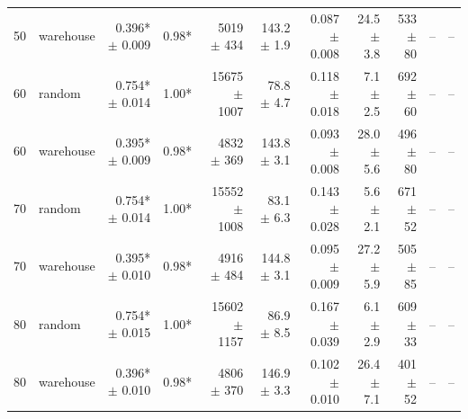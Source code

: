 \begin{tabular}{llrrrrrrrrr}
50 & warehouse & \num{0.396}* $\pm$ \num{0.009} & \num{0.98}* & \num{5019} $\pm$ \num{434} & \num{143.2} $\pm$ \num{1.9} & \num{0.087} $\pm$ \num{0.008} & \num{24.5} $\pm$ \num{3.8} & \num{533} $\pm$ \num{80} & -- & -- \\
60 & random & \num{0.754}* $\pm$ \num{0.014} & \num{1.00}* & \num{15675} $\pm$ \num{1007} & \num{78.8} $\pm$ \num{4.7} & \num{0.118} $\pm$ \num{0.018} & \num{7.1} $\pm$ \num{2.5} & \num{692} $\pm$ \num{60} & -- & -- \\
60 & warehouse & \num{0.395}* $\pm$ \num{0.009} & \num{0.98}* & \num{4832} $\pm$ \num{369} & \num{143.8} $\pm$ \num{3.1} & \num{0.093} $\pm$ \num{0.008} & \num{28.0} $\pm$ \num{5.6} & \num{496} $\pm$ \num{80} & -- & -- \\
70 & random & \num{0.754}* $\pm$ \num{0.014} & \num{1.00}* & \num{15552} $\pm$ \num{1008} & \num{83.1} $\pm$ \num{6.3} & \num{0.143} $\pm$ \num{0.028} & \num{5.6} $\pm$ \num{2.1} & \num{671} $\pm$ \num{52} & -- & -- \\
70 & warehouse & \num{0.395}* $\pm$ \num{0.010} & \num{0.98}* & \num{4916} $\pm$ \num{484} & \num{144.8} $\pm$ \num{3.1} & \num{0.095} $\pm$ \num{0.009} & \num{27.2} $\pm$ \num{5.9} & \num{505} $\pm$ \num{85} & -- & -- \\
80 & random & \num{0.754}* $\pm$ \num{0.015} & \num{1.00}* & \num{15602} $\pm$ \num{1157} & \num{86.9} $\pm$ \num{8.5} & \num{0.167} $\pm$ \num{0.039} & \num{6.1} $\pm$ \num{2.9} & \num{609} $\pm$ \num{33} & -- & -- \\
80 & warehouse & \num{0.396}* $\pm$ \num{0.010} & \num{0.98}* & \num{4806} $\pm$ \num{370} & \num{146.9} $\pm$ \num{3.3} & \num{0.102} $\pm$ \num{0.010} & \num{26.4} $\pm$ \num{7.1} & \num{401} $\pm$ \num{52} & -- & -- \\
\bottomrule
\end{tabular}


